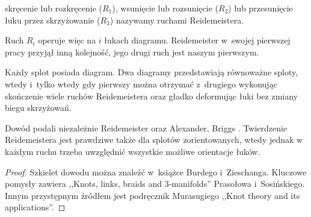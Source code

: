 \begin{definition}

    skręcenie lub rozkręcenie ($R_1$), wsunięcie lub rozsunięcie ($R_2$) lub przesunięcie łuku przez skrzyżowanie ($R_3$) nazywamy ruchami Reidemeistera.
\end{definition}

Ruch $R_i$ operuje więc na $i$ łukach diagramu.
Reidemeister w~swojej pierwszej pracy przyjął inną kolejność,
jego drugi ruch jest naszym pierwszym.

\begin{theorem}[Reidemeister, 1927]
    \label{thm:reidemeister}
    Każdy splot posiada diagram.
    Dwa diagramy przedstawiają równoważne sploty,
    wtedy i~tylko wtedy gdy pierwszy można otrzymać z~drugiego
    wykonując skończenie wiele ruchów Reidemeistera
    oraz gładko deformując łuki bez zmiany biegu skrzyżowań.
\end{theorem}

Dowód podali niezależnie Reidemeister \cite{reidemeister27} oraz Alexander, Briggs \cite{briggs27}.
Twierdzenie Reidemeistera jest prawdziwe także dla splotów zorientowanych, wtedy jednak w każdym ruchu trzeba uwzględnić wszystkie możliwe orientacje łuków.

\begin{proof}
    Szkielet dowodu można znaleźć w~książce Burdego i~Zieschanga.
    Kluczowe pomysły zawiera ,,Knots, links, braids and $3$-manifolds''
    Prasołowa i~Sosińskiego.
    Innym przystępnym źródłem jest podręcznik \cite{murasugi96} Murasugiego ,,Knot theory and its applications''.
\end{proof}

